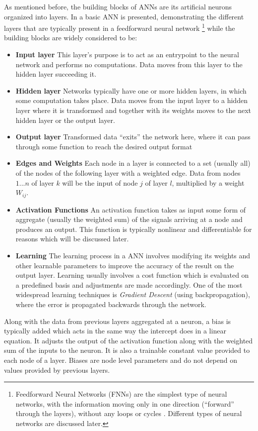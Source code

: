     As mentioned before, the building blocks of ANNs are its artificial
    neurons organized into layers. In   a basic
    ANN is presented, demonstrating the different layers that are typically
    present in a feedforward neural network \footnote{Feedforward Neural Networks
    (FNNs) are the simplest type of neural networks, with the information moving
    only in one direction (``forward'' through the layers), without any loops or
    cycles \cite{article:SCHMID}. Different types of neural networks are discussed
    later.} while the building blocks are widely considered \cite{article:SCHMID} to
    be:
    \begin{itemize}
    \item \textbf{Input layer} This layer's purpose is to act as an
    entrypoint to the neural network and performs no computations. Data moves from
    this layer to the hidden layer succeeding it.
    \item \textbf{Hidden layer} Networks typically have one or more
    hidden layers, in which some computation takes place. Data moves from the input
    layer to a hidden layer where it is transformed and together with its weights
    moves to the next hidden layer or the output layer.
    \item \textbf{Output layer} Transformed data ``exits'' the network here,
    where it can pass through some function to reach the desired output
    format
    \item \textbf{Edges and Weights} Each node in a layer is connected
    to a set (usually all) of the nodes of the following layer with a
    weighted edge. Data from nodes $1 ... n$ of layer $k$ will be the input
    of node $j$ of layer $l$, multiplied by a weight $W_{ij}$. 
    \item \textbf{Activation Functions} An activation function takes as
    input some form of aggregate (usually the weighted sum) of the signals
  arriving at a node and produces an output. This function is typically
  nonlinear and differentiable for reasons which will be discussed later.
\item \textbf{Learning} The learning process in a ANN involves modifying
  its weights and other learnable parameters to improve the accuracy
  of the result on the output layer. Learning usually involves a cost
  function which is evaluated on a predefined basis and adjustments are
  made accordingly. One of the most widespread learning techniques is
  \textit{Gradient Descent} (using backpropagation), where the error is
  propagated backwards through the network.
  
\end{itemize}
Along with the data from previous layers aggregated at a neuron, a bias
is typically added which acts in the same way the intercept does in a
linear equation. It adjusts the output of the activation function along
with the weighted sum of the inputs to the neuron. It is also a trainable
constant value provided to each node of a layer. Biases are node level
parameters and do not depend on values provided by previous layers.


